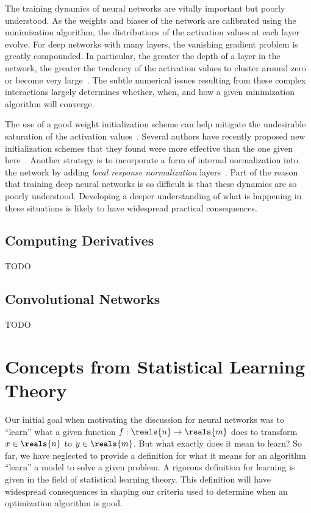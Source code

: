 \documentclass[11pt,a4paper]{article}
\numberwithin{equation}{section}
\begin{document}
The training dynamics of neural networks are vitally important but poorly
understood. As the weights and biases of the network are calibrated using the
minimization algorithm, the distributions of the activation values at each layer
evolve. For deep networks with many layers, the vanishing gradient problem is
greatly compounded. In particular, the greater the depth of a layer in the
network, the greater the tendency of the activation values to cluster around
zero or become very large~\citep{glorot2010understanding}. The subtle numerical
issues resulting from these complex interactions largely determines whether,
when, and how a given minimization algorithm will converge.

The use of a good weight initialization scheme can help mitigate the undesirable
saturation of the activation values~\citep{glorot2010understanding}. Several
authors have recently proposed new initialization schemes that they found were
more effective than the one given here~\citep{glorot2010understanding,
martens2010deep}. Another strategy is to incorporate a form of internal
normalization into the network by adding \emph{local response normalization}
layers~\citep{krizhevsky2012imagenet}. Part of the reason that training deep
neural networks is so difficult is that these dynamics are so poorly understood.
Developing a deeper understanding of what is happening in these situations is
likely to have widespread practical consequences.

\subsection{Computing Derivatives}

TODO

\subsection{Convolutional Networks}

TODO

\section{Concepts from Statistical Learning Theory}

Our initial goal when motivating the discussion for neural networks was to
``learn'' what a given function $f: \reals{n} \to \reals{m}$ does to transform
$x \in \reals{n}$ to $y \in \reals{m}$. But what exactly does it mean to learn?
So far, we have neglected to provide a definition for what it means for an
algorithm ``learn'' a model to solve a given problem. A rigorous definition for
learning is given in the field of statistical learning theory. This definition
will have widespread consequences in shaping our criteria used to determine when
an optimization algorithm is good.
\end{document}

